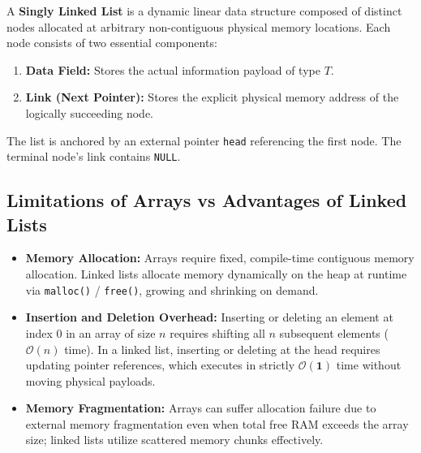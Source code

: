 \documentclass[12pt,a4paper]{article}
\begin{document}
\begin{tcolorbox}[defbox, title={\textbf{Definition: Singly Linked List (SLL) Architecture}}]
A \textbf{Singly Linked List} is a dynamic linear data structure composed of distinct nodes allocated at arbitrary non-contiguous physical memory locations. Each node consists of two essential components:
\begin{enumerate}[leftmargin=*, nosep]
  \item \textbf{Data Field:} Stores the actual information payload of type $T$.
  \item \textbf{Link (Next Pointer):} Stores the explicit physical memory address of the logically succeeding node.
\end{enumerate}
The list is anchored by an external pointer \texttt{head} referencing the first node. The terminal node's link contains \texttt{NULL}.
\end{tcolorbox}

\subsection{Limitations of Arrays vs Advantages of Linked Lists}
\begin{itemize}[leftmargin=*, itemsep=3pt]
  \item \textbf{Memory Allocation:} Arrays require fixed, compile-time contiguous memory allocation. Linked lists allocate memory dynamically on the heap at runtime via \texttt{malloc()} / \texttt{free()}, growing and shrinking on demand.
  \item \textbf{Insertion and Deletion Overhead:} Inserting or deleting an element at index $0$ in an array of size $n$ requires shifting all $n$ subsequent elements ($\mathcal{O}(n)$ time). In a linked list, inserting or deleting at the head requires updating pointer references, which executes in strictly $\mathbf{\mathcal{O}(1)}$ time without moving physical payloads.
  \item \textbf{Memory Fragmentation:} Arrays can suffer allocation failure due to external memory fragmentation even when total free RAM exceeds the array size; linked lists utilize scattered memory chunks effectively.
\end{itemize}
\end{document}
